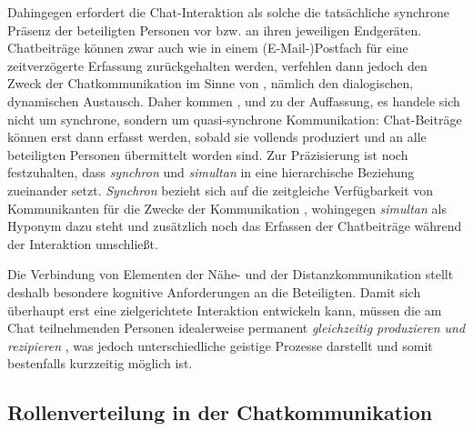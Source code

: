 Dahingegen erfordert die Chat-Interaktion als solche die tatsächliche synchrone Präsenz der beteiligten Personen vor bzw. an ihren jeweiligen Endgeräten. Chatbeiträge können zwar auch wie in einem (E-Mail-)Postfach für eine zeitverzögerte Erfassung zurückgehalten werden, verfehlen dann jedoch den Zweck der Chatkommunikation im Sinne von \citet[30]{beiswenger_sprachhandlungskoordination_2007}, nämlich den dialogischen, dynamischen Austausch. Daher kommen \citet[]{storrer_sprachliche_2001}, \citet[]{beiswenger_sprachhandlungskoordination_2007} und \citet[]{schweiger_onlinekommunikation_2019} zu der Auffassung, es handele sich nicht um synchrone, sondern um quasi-synchrone Kommunikation: Chat-Beiträge können erst dann erfasst werden, sobald sie vollends produziert und an alle beteiligten Personen übermittelt worden sind. Zur Präzisierung ist noch festzuhalten, dass \citet[23]{beiswenger_sprachhandlungskoordination_2007} \emph{synchron} und \emph{simultan} in eine hierarchische Beziehung zueinander setzt. \emph{Synchron} bezieht sich auf die \glqq zeitgleiche Verfügbarkeit von Kommunikanten für die Zwecke der Kommunikation\grqq{} \citep[23]{beiswenger_sprachhandlungskoordination_2007}, wohingegen \emph{simultan} als Hyponym dazu steht und zusätzlich noch das Erfassen der Chatbeiträge während der Interaktion umschließt.

\begin{sloppypar}
Die Verbindung von Elementen der Nähe- und der Distanzkommunikation stellt deshalb besondere kognitive Anforderungen an die Beteiligten. Damit sich überhaupt erst eine zielgerichtete Interaktion entwickeln kann, müssen die am Chat teilnehmenden Personen \glqq idealerweise permanent \emph{gleichzeitig produzieren und rezipieren}\grqq{} \citep[260, Hervorhebung im Original]{beiswenger_chattern_2010}, was jedoch unterschiedliche geistige Prozesse darstellt und somit \glqq bestenfalls kurzzeitig möglich ist\grqq{}.
\end{sloppypar}


%

\subsection{Rollenverteilung in der Chatkommunikation}
\label{K2:subsec:turn-taking-chat}

